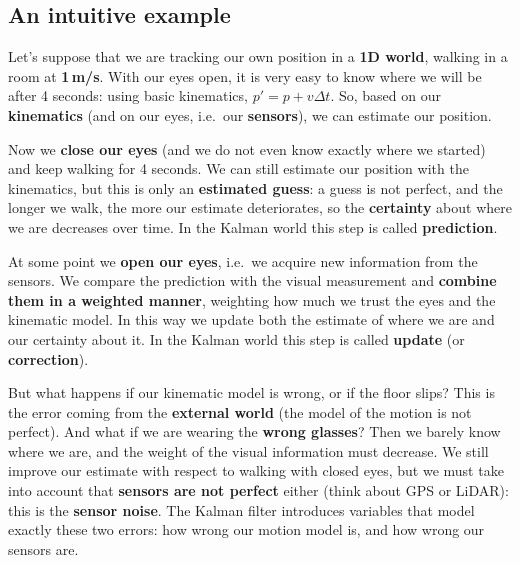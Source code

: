 \subsection{An intuitive example}
Let's suppose that we are tracking our own position in a \textbf{1D world}, walking in a room at \textbf{1\,m/s}.
With our eyes open, it is very easy to know where we will be after 4 seconds: using basic kinematics, $p' = p + v\Delta t$.
So, based on our \textbf{kinematics} (and on our eyes, i.e.\ our \textbf{sensors}), we can estimate our position.

Now we \textbf{close our eyes} (and we do not even know exactly where we started) and keep walking for 4 seconds.
We can still estimate our position with the kinematics, but this is only an \textbf{estimated guess}: a guess is not perfect, and the longer we walk, the more our estimate deteriorates, so the \textbf{certainty} about where we are decreases over time.
In the Kalman world this step is called \textbf{prediction}.

At some point we \textbf{open our eyes}, i.e.\ we acquire new information from the sensors.
We compare the prediction with the visual measurement and \textbf{combine them in a weighted manner}, weighting how much we trust the eyes and the kinematic model.
In this way we update both the estimate of where we are and our certainty about it.
In the Kalman world this step is called \textbf{update} (or \textbf{correction}).

But what happens if our kinematic model is wrong, or if the floor slips? This is the error coming from the \textbf{external world} (the model of the motion is not perfect).
And what if we are wearing the \textbf{wrong glasses}? Then we barely know where we are, and the weight of the visual information must decrease.
We still improve our estimate with respect to walking with closed eyes, but we must take into account that \textbf{sensors are not perfect} either (think about GPS or LiDAR): this is the \textbf{sensor noise}.
The Kalman filter introduces variables that model exactly these two errors: how wrong our motion model is, and how wrong our sensors are.

